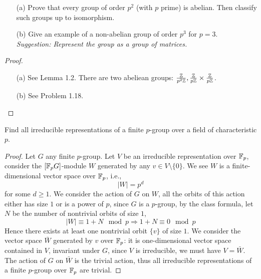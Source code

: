 \begin{prob}[F2014-Q5]
    \phantom{text}
    \begin{enumerate}
        \item[(a)] Prove that every group of order \( p^2 \) (with \( p \) prime) is abelian. Then classify such groups up to isomorphism.
    
        \item[(b)] Give an example of a non-abelian group of order \( p^3 \) for \( p = 3 \). \\
        \emph{Suggestion: Represent the group as a group of matrices.}
    \end{enumerate}    
\end{prob}
\begin{proof}
    \begin{itemize}
        \item[(a)] See Lemma 1.2. There are two abeliean groups: $\frac{\mathbb{Z}}{p^2\mathbb{Z}}, \frac{\mathbb{Z}}{p\mathbb{Z}}\times\frac{\mathbb{Z}}{p\mathbb{Z}}$.
        \item[(b)] See Problem 1.18.
    \end{itemize}
\end{proof}

\begin{prob}[F2019-Q4, S2015-Q3]
    Find all irreducible representations of a finite $p$-group over a field of characteristic $p$.
\end{prob}
\begin{proof}
    Let $G$ any finite $p$-group. Let $V$ be an irreducible representation over $\mathbb{F}_p$, consider the $[\mathbb{F}_pG]$-module $W$ generated by any $v\in V\setminus\{0\}$. We see $W$ is a finite-dimensional vector space over $\mathbb{F}_p$, i.e., 
    \begin{equation*}
        |W|=p^d
    \end{equation*}
    for some $d\geq 1$. We consider the action of $G$ on $W$, all the orbits of this action either has size $1$ or is a power of $p$, since $G$ is a $p$-group, by the class formula, let $N$ be the number of nontrivial orbits of size $1$, 
    \begin{equation*}
        |W|\equiv 1+N\mod p\Rightarrow 1+N\equiv 0\mod p
    \end{equation*}
    Hence there exists at least one nontrivial orbit $\{v\}$ of size $1$. We consider the vector space $\bar{W}$ generated by $v$ over $\mathbb{F}_p$: it is one-dimensional vector space contained in $V$, invariant under $G$, since $V$ is irreducible, we must have $V=\bar{W}$. The action of $G$ on $\bar{W}$ is the trivial action, thus all irreducible representations of a finite $p$-group over $\mathbb{F}_p$ are trivial.
\end{proof}


